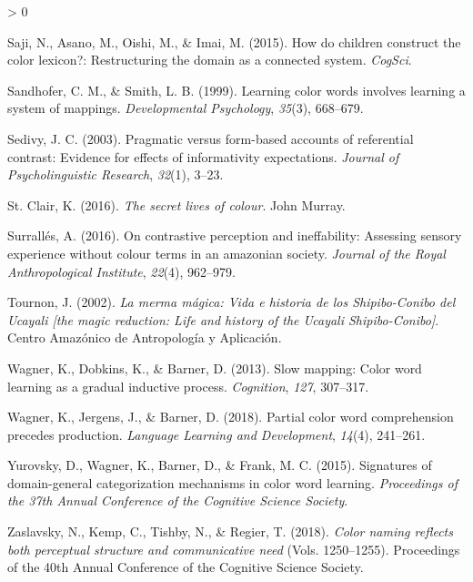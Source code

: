 \documentclass[
  english,
  ,apa7,floatsintext]{apa6}
\newlength{\cslhangindent}
\newenvironment{CSLReferences}[2] %
 {%
  \setlength{\parindent}{0pt}
  \ifodd #1 \everypar{\setlength{\hangindent}{\cslhangindent}}\ignorespaces\fi
  \ifnum #2 > 0
  \setlength{\parskip}{#2\baselineskip}
  \fi
 }%
 {}
\begin{document}
\begin{CSLReferences}{1}{0}
\leavevmode\hypertarget{ref-saji2015}{}%
Saji, N., Asano, M., Oishi, M., \& Imai, M. (2015). How do children construct the color lexicon?: Restructuring the domain as a connected system. \emph{CogSci}.

\leavevmode\hypertarget{ref-sandhofer1999}{}%
Sandhofer, C. M., \& Smith, L. B. (1999). Learning color words involves learning a system of mappings. \emph{Developmental Psychology}, \emph{35}(3), 668--679.

\leavevmode\hypertarget{ref-sedivy2003}{}%
Sedivy, J. C. (2003). Pragmatic versus form-based accounts of referential contrast: Evidence for effects of informativity expectations. \emph{Journal of Psycholinguistic Research}, \emph{32}(1), 3--23.

\leavevmode\hypertarget{ref-stclair2016}{}%
St. Clair, K. (2016). \emph{The secret lives of colour}. John Murray.

\leavevmode\hypertarget{ref-surralles2016}{}%
Surrallés, A. (2016). On contrastive perception and ineffability: Assessing sensory experience without colour terms in an amazonian society. \emph{Journal of the Royal Anthropological Institute}, \emph{22}(4), 962--979.

\leavevmode\hypertarget{ref-tournon2002}{}%
Tournon, J. (2002). \emph{La merma m{á}gica: Vida e historia de los {S}hipibo-{C}onibo del {U}cayali {[}the magic reduction: Life and history of the {U}cayali {S}hipibo-{C}onibo{]}}. Centro Amaz{ó}nico de Antropolog{í}a y Aplicaci{ó}n.

\leavevmode\hypertarget{ref-wagner2013}{}%
Wagner, K., Dobkins, K., \& Barner, D. (2013). Slow mapping: Color word learning as a gradual inductive process. \emph{Cognition}, \emph{127}, 307--317.

\leavevmode\hypertarget{ref-wagner2018}{}%
Wagner, K., Jergens, J., \& Barner, D. (2018). Partial color word comprehension precedes production. \emph{Language Learning and Development}, \emph{14}(4), 241--261.

\leavevmode\hypertarget{ref-yurovsky2015}{}%
Yurovsky, D., Wagner, K., Barner, D., \& Frank, M. C. (2015). Signatures of domain-general categorization mechanisms in color word learning. \emph{Proceedings of the 37th Annual Conference of the Cognitive Science Society}.

\leavevmode\hypertarget{ref-zaslavsky2018}{}%
Zaslavsky, N., Kemp, C., Tishby, N., \& Regier, T. (2018). \emph{Color naming reflects both perceptual structure and communicative need} (Vols. 1250--1255). Proceedings of the 40th Annual Conference of the Cognitive Science Society.

\end{CSLReferences}

\endgroup
\end{document}
